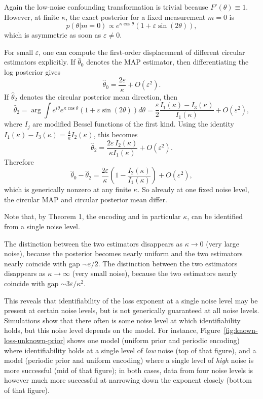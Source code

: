 Again the low-noise confounding transformation is trivial because $F'(\theta)\equiv 1$.
However, at finite $\kappa$, the exact posterior for a fixed measurement $m=0$ is
\begin{equation}
p(\theta|m=0)\propto e^{\kappa \cos\theta}\left(1+\varepsilon\sin(2\theta)\right),
\end{equation}
which is asymmetric as soon as $\varepsilon\neq 0$.

For small $\varepsilon$, one can compute the first-order displacement of different circular estimators explicitly.
If $\hat\theta_0$ denotes the MAP estimator, then differentiating the log posterior gives
\begin{equation}
\hat\theta_0=\frac{2\varepsilon}{\kappa}+O(\varepsilon^2).
\end{equation}
If $\hat\theta_2$ denotes the circular posterior mean direction, then
\begin{equation}
\hat\theta_2=
\arg \int e^{i\theta} e^{\kappa\cos\theta}\left(1+\varepsilon\sin(2\theta)\right)d\theta
=
\frac{\varepsilon}{2}\frac{I_1(\kappa)-I_3(\kappa)}{I_1(\kappa)}+O(\varepsilon^2),
\end{equation}
where $I_j$ are modified Bessel functions of the first kind.
Using the identity $I_1(\kappa)-I_3(\kappa)=\frac{4}{\kappa}I_2(\kappa)$, this becomes
\begin{equation}
\hat\theta_2=
\frac{2\varepsilon\, I_2(\kappa)}{\kappa I_1(\kappa)}+O(\varepsilon^2).
\end{equation}
Therefore
\begin{equation}
\hat\theta_0-\hat\theta_2=
\frac{2\varepsilon}{\kappa}\left(1-\frac{I_2(\kappa)}{I_1(\kappa)}\right)+O(\varepsilon^2),
\end{equation}
which is generically nonzero at any finite $\kappa$.
So already at one fixed noise level, the circular MAP and circular posterior mean differ.

Note that, by Theorem 1, the encoding and in particular $\kappa$, can be identified from a single noise level.

The distinction between the two estimators disappears as $\kappa\to 0$ (very large noise), because the posterior becomes nearly uniform and the two estimators nearly coincide with gap $\sim \varepsilon/2$.
The distinction between the two estimators disappears as $\kappa\to\infty$ (very small noise), because the two estimators nearly coincide with gap $\sim 3\varepsilon/\kappa^2$.

This reveals that identifiability of the loss exponent at a single noise level may be present at certain noise levels, but is not generically guaranteed at all noise levels.
Simulations show that there often is some noise level at which identifiability holds, but this noise level depends on the model.
For instance, Figure~\ref{fig:known-loss-unknown-prior} shows one model (uniform prior and periodic encoding) where identifiability holds at a single level of \emph{low} noise (top of that figure), and a model (periodic prior and uniform encoding) where a single level of \emph{high} noise is more successful (mid of that figure); in both cases, data from four noise levels is however much more successful at narrowing down the exponent closely (bottom of that figure).

